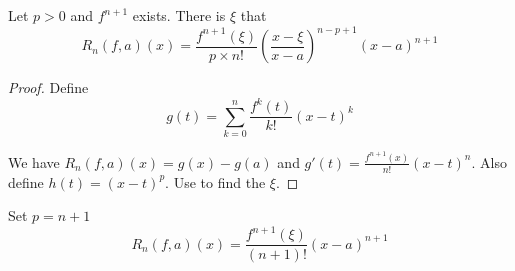 \begin{theorem}
    Let $p > 0$ and $f^{n+1}$ exists. There is $\xi$ that
    \begin{equation}
        R_n(f,a)(x) = \frac{f^{n+1}(\xi)}{p \times n!}\left( \frac{x-\xi}{x-a} \right)^{n-p+1} (x-a)^{n+1}
    \end{equation}
\end{theorem}
\begin{proof}
    Define
    \begin{equation}
        g(t) = \sum_{k=0}^n \frac{f^k (t)}{k!}(x-t)^k
    \end{equation}
    
    We have $R_n (f,a)(x) = g(x) - g(a)$ and $g'(t) = \frac{f^{n+1}(x)}{n!}(x-t)^n$. Also define $h(t) = (x-t)^p$. Use  to find the $\xi$.
\end{proof}

\begin{theorem}
    Set $p = n+1$
    \begin{equation}
        R_n (f,a)(x) = \frac{f^{n+1}(\xi)}{(n+1)!}(x-a)^{n+1}
    \end{equation}
\end{theorem}

